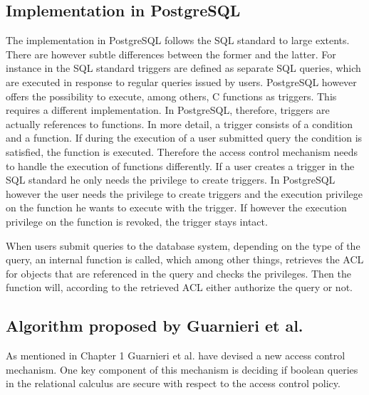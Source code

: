 \subsection{Implementation in PostgreSQL}

The implementation in PostgreSQL follows the SQL standard to large extents. 
%
There are however subtle differences between the former and the latter.
%
For instance in the SQL standard triggers are defined as separate SQL queries, which are executed in response to regular queries issued by users. 
%
PostgreSQL however offers the possibility to execute, among others, C functions as triggers.
%
This requires a different implementation.
%
In PostgreSQL, therefore, triggers are actually  references to functions. In more detail, a trigger consists of a condition and a function.
%
If during the execution of a user submitted query the condition is satisfied, the function is executed. 
%
Therefore the access control mechanism needs to handle the execution of functions differently.
%
If a user creates a trigger in the SQL standard he only needs the privilege to create triggers.
%
In PostgreSQL however the user needs the privilege to create triggers and the execution privilege on the function he wants to execute with the trigger.
%
If however the execution privilege on the function is revoked, the trigger stays intact.

When users submit queries to the database system, depending on the type of the query, an internal function is called, which among other things, retrieves the ACL for objects that are referenced in the query and checks the privileges.
%
Then the function will, according to the retrieved ACL either authorize the query or not.

\subsection{Algorithm proposed by Guarnieri et al.}

As mentioned in Chapter 1 Guarnieri et al. have devised a new access control mechanism.
%
One key component of this mechanism is deciding if boolean queries in the relational calculus are secure with respect to the access control policy.
%
%
